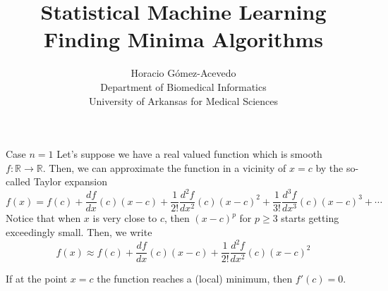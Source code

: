 \documentclass{beamer}
\title{Statistical Machine Learning\\ Finding Minima Algorithms}
\author{Horacio G\'omez-Acevedo\\ Department of Biomedical Informatics\\
	University of Arkansas for Medical Sciences}
\begin{document}
	\begin{frame}[plain]
		\maketitle
	\end{frame}
	
	\begin{frame}{Case $n=1$}
		Let's suppose we have a real valued function which is smooth $f\colon \mathbb{R}\to \mathbb{R}$. Then, we can approximate the function in a vicinity of $x=c$ by the so-called Taylor expansion
		\begin{equation*}
			f(x)= f(c)+ \frac{df}{dx}(c) (x-c)+  \frac{1}{2!} \frac{d^2f}{dx^2}(c) (x-c)^2 +  \frac{1}{3!} \frac{d^3f}{dx^3}(c) (x-c)^3+ \cdots
		\end{equation*}
		Notice that when $x$ is very close to $c$, then $(x-c)^p$ for $p\ge 3$ starts getting exceedingly small. Then, we write 
			\begin{equation*}
			f(x) \approx f(c)+ \frac{df}{dx}(c) (x-c)+  \frac{1}{2!} \frac{d^2f}{dx^2}(c) (x-c)^2 
		\end{equation*}
		
		If at the point $x=c$ the function reaches a (local) minimum, then $f'(c)=0$.
		
		
	\end{frame}
\end{document}
